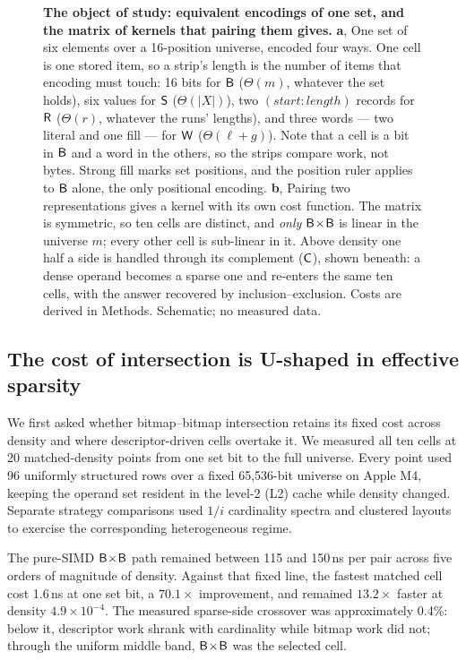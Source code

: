\begin{figure}[!t]
\centering

\caption{\textbf{The object of study: equivalent encodings of one set, and the matrix of kernels
that pairing them gives.}
\textbf{a}, One set of six elements over a 16-position universe, encoded four ways. One cell is one
stored item, so a strip's length is the number of items that encoding must touch: 16 bits for $\textsf{B}$
($\Theta(m)$, whatever the set holds), six values for $\textsf{S}$ ($\Theta(|X|)$), two
$(\mathit{start}{:}\mathit{length})$ records for $\textsf{R}$ ($\Theta(r)$, whatever the runs' lengths), and
three words --- two literal and one fill --- for $\textsf{W}$ ($\Theta(\ell+g)$). Note that a cell is a bit
in $\textsf{B}$ and a word in the others, so the strips compare work, not bytes. Strong fill marks set
positions, and the position ruler applies to $\textsf{B}$ alone, the only positional encoding.
\textbf{b}, Pairing two representations gives a kernel with its own cost function. The matrix is
symmetric, so ten cells are distinct, and \emph{only} $\textsf{B}\!\times\!\textsf{B}$ is linear in the universe
$m$; every other cell is sub-linear in it. Above density one half a side is handled through its
complement ($\textsf{C}$), shown beneath: a dense operand becomes a sparse one and re-enters the same ten
cells, with the answer recovered by inclusion--exclusion. Costs are derived in Methods.
Schematic; no measured data.}
\label{fig:pairing-matrix}
\end{figure}

\subsection*{The cost of intersection is U-shaped in effective sparsity}
\label{sec:r1}

We first asked whether bitmap--bitmap intersection retains its fixed cost across density and where
descriptor-driven cells overtake it. We measured all ten cells at 20 matched-density points from one
set bit to the full universe. Every point used 96 uniformly structured rows over a fixed 65,536-bit
universe on Apple M4, keeping the operand set resident in the level-2 (L2) cache while density changed. Separate strategy
comparisons used $1/i$ cardinality spectra and clustered layouts to exercise the corresponding
heterogeneous regime.

The pure-SIMD $\textsf{B}\!\times\!\textsf{B}$ path remained between 115 and 150\,ns per pair across five orders of
magnitude of density. Against that fixed line, the fastest matched cell cost 1.6\,ns at one set bit,
a $70.1\times$ improvement, and remained $13.2\times$ faster at density $4.9\times10^{-4}$. The
measured sparse-side crossover was approximately 0.4\%: below it, descriptor work shrank with
cardinality while bitmap work did not; through the uniform middle band, $\textsf{B}\!\times\!\textsf{B}$ was the
selected cell.

